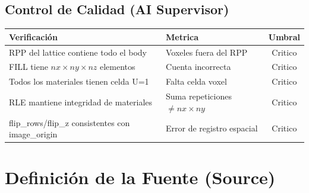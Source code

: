 \documentclass[12pt,a4paper]{article}
\begin{document}
\begin{tcolorbox}[aiSupervisor]

\begin{tcolorbox}[aiSupervisor]
\subsection*{Control de Calidad (AI Supervisor)}

\begin{table}[H]
\centering
\begin{tabular}{llc}
\toprule
\textbf{Verificación} & \textbf{Metrica} & \textbf{Umbral} \\
\midrule
RPP del lattice contiene todo el body & Voxeles fuera del RPP & Critico \\
FILL tiene $nx \times ny \times nz$ elementos & Cuenta incorrecta & Critico \\
Todos los materiales tienen celda U=1 & Falta celda voxel & Critico \\
RLE mantiene integridad de materiales & Suma repeticiones $\neq nx \times ny$ & Critico \\
flip\_rows/flip\_z consistentes con image\_origin & Error de registro espacial & Critico \\
\bottomrule
\end{tabular}
\end{table}

\newpage


\newpage


\newpage


\newpage

\end{tcolorbox}
\end{tcolorbox}
\section{Definición de la Fuente (Source)}
\label{sec:fuente}
\end{document}

